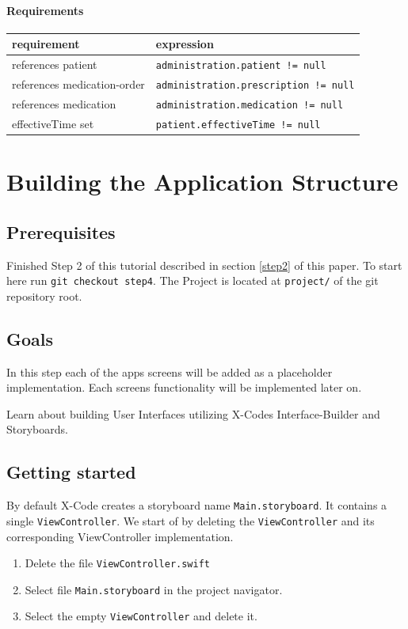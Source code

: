\documentclass{article}
\begin{document}
\paragraph{Requirements}\label{res:medicationadministration:requirements}
\begin{longtable}[]{@{}ll@{}}
\toprule requirement & expression\tabularnewline
\midrule
references patient & \texttt{administration.patient\ !=\ null} \tabularnewline
references medication-order & \texttt{administration.prescription\ !=\ null}\tabularnewline
references medication & \texttt{administration.medication\ !=\ null}\tabularnewline
effectiveTime set & \texttt{patient.effectiveTime\ !=\ null} \tabularnewline
\bottomrule
\end{longtable}

\section{Building the Application
Structure}\label{step4}

\subsection{Prerequisites}\label{step4:prerequisites}
Finished Step 2 of this tutorial described in section \ref{step2} of this paper.
To start here run \texttt{git checkout step4}.
The Project is located at \texttt{project/} of the git repository root.

\subsection{Goals}\label{step4:goals}
In this step each of the apps screens will be added as a placeholder
implementation. Each screens functionality will be implemented later on.

Learn about building User Interfaces utilizing X-Codes Interface-Builder
and Storyboards.

\subsection{Getting started}\label{step4:getting-started}
By default X-Code creates a storyboard name \texttt{Main.storyboard}.
It contains a single \texttt{ViewController}.
We start of by deleting the \texttt{ViewController} and its
corresponding ViewController implementation.

\begin{enumerate}
\def\labelenumi{\arabic{enumi}.}

\item
  Delete the file \texttt{ViewController.swift}
\item
  Select file \texttt{Main.storyboard} in the project navigator.
\item
  Select the empty \texttt{ViewController} and delete it.
\end{enumerate}
\end{document}
